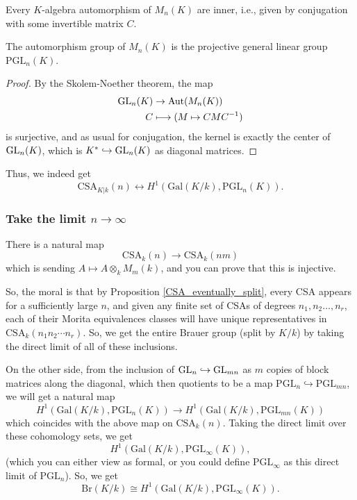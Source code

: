 \documentclass[12pt]{article}
\newcommand{\Br}{\mathrm{Br}}
\newcommand{\Gal}{\mathrm{Gal}}
\newcommand{\PGL}{\mathrm{PGL}}
\begin{document}
\begin{prop}
    Every $K$-algebra automorphism of $M_n(K)$ are inner, i.e., given by conjugation with some invertible matrix $C$.
\end{prop}

\begin{cor}
    The automorphism group of $M_n(K)$ is the projective general linear group $\PGL_n(K)$.
\end{cor}
\begin{proof}
    By the Skolem-Noether theorem, the map
    \begin{align*}
        \mathrm{GL}_n(K) &\to \mathrm{Aut}(M_n(K))\\
        C &\longmapsto (M\mapsto CMC^{-1})
    \end{align*}
    is surjective, and as usual for conjugation, the kernel is exactly the center of $\mathrm{GL}_n(K)$, which is $K^* \hookrightarrow \mathrm{GL}_n(K)$ as diagonal matrices.
\end{proof}

Thus, we indeed get
\[\mathrm{CSA}_{K|k}(n) \leftrightarrow H^1(\Gal(K/k), \PGL_n(K)).\]


\subsubsection{Take the limit $n\to \infty$}

There is a natural map
\[\mathrm{CSA}_k(n) \to \mathrm{CSA}_k(nm)\]
which is sending $A\mapsto A\otimes_k M_m(k)$, and you can prove that this is injective.

So, the moral is that by Proposition \ref{CSA_eventually_split}, every CSA appears for a sufficiently large $n$, and given any finite set of CSAs of degrees $n_1,n_2\dots,n_r$, each of their Morita equivalences classes will have unique representatives in $\mathrm{CSA}_k(n_1 n_2\cdots n_r)$. So, we get the entire Brauer group (split by $K/k$) by taking the direct limit of all of these inclusions.

On the other side, from the inclusion of $\mathrm{GL}_n \hookrightarrow \mathrm{GL}_{mn}$ as $m$ copies of block matrices along the diagonal, which then quotients to be a map $\PGL_n\hookrightarrow \PGL_{mn}$, we will get a natural map
\[H^1(\Gal(K/k), \PGL_n(K)) \to H^1(\Gal(K/k), \PGL_{mn}(K))\]
which coincides with the above map on $\mathrm{CSA}_k(n)$. Taking the direct limit over these cohomology sets, we get
\[H^1(\Gal(K/k), \PGL_\infty(K)),\]
(which you can either view as formal, or you could define $\PGL_\infty$ as this direct limit of $\PGL_n$). So, we get
\[\Br(K/k) \cong H^1(\Gal(K/k), \PGL_\infty(K)).\]
\end{document}
